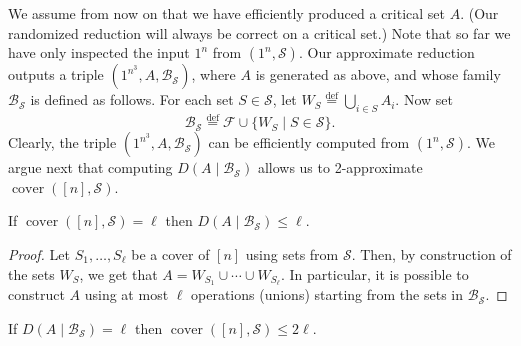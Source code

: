 We assume from now on that we have efficiently produced a critical set $A$. (Our randomized reduction will always be correct on a critical set.) Note that so far we have only inspected the input $1^n$ from $(1^n,\mathcal S)$. Our approximate reduction outputs a triple $(1^{n^3},A,\mathcal B_{\mathcal S})$, where $A$ is generated as above, and whose family $\mathcal B_{\mathcal S}$ is defined as follows. For each set $S\in\mathcal S$, let $W_S\stackrel{\mathrm{def}}=\bigcup_{i\in S}A_i$. Now set
\[\mathcal B_{\mathcal S}\stackrel{\mathrm{def}}=\mathcal F\cup\{W_S\mid S\in\mathcal S\}.\]
Clearly, the triple $(1^{n^3},A,\mathcal B_{\mathcal S})$ can be efficiently computed from $(1^n,\mathcal S)$. We argue next that computing $D(A\mid\mathcal B_{\mathcal S})$ allows us to 2-approximate $\operatorname{cover}([n],\mathcal S)$.
\begin{ntlemma}
If $\operatorname{cover}([n],\mathcal S)=\ell$ then $D(A\mid\mathcal B_{\mathcal S})\leq\ell$.
\end{ntlemma}
\begin{proof}
Let $S_1,\ldots,S_\ell$ be a cover of $[n]$ using sets from $\mathcal S$. Then, by construction of the sets $W_S$, we get that $A=W_{S_1}\cup\cdots\cup W_{S_\ell}$. In particular, it is possible to construct $A$ using at most $\ell$ operations (unions) starting from the sets in $\mathcal B_{\mathcal S}$.
\end{proof}
\begin{ntlemma}
If $D(A\mid\mathcal B_{\mathcal S})=\ell$ then $\operatorname{cover}([n],\mathcal S)\leq2\ell$.
\end{ntlemma}
